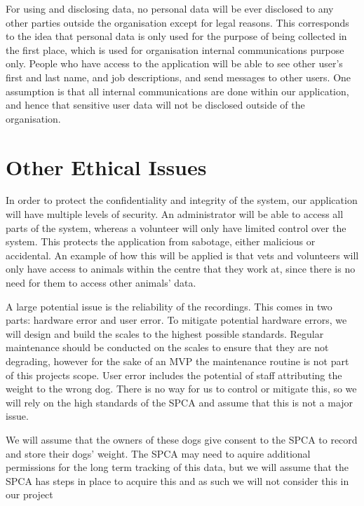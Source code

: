 For using and disclosing data, no personal data will be ever disclosed to any other parties outside the organisation except for legal reasons. This corresponds to the idea that personal data is only used for the purpose of being collected in the first place, which is used for organisation internal communications purpose only. People who have access to the application will be able to see other user's first and last name, and job descriptions, and send messages to other users. One assumption is that all internal communications are done within our application, and hence that sensitive user data will not be disclosed outside of the organisation.


\section{Other Ethical Issues}

In order to protect the confidentiality and integrity of the system, our application will have multiple levels of security. An administrator will be able to access all parts of the system, whereas a volunteer will only have limited control over the system. This protects the application from sabotage, either malicious or accidental. An example of how this will be applied is that vets and volunteers will only have access to animals within the centre that they work at, since there is no need for them to access other animals’ data. 

A large potential issue is the reliability of the recordings. This comes in two parts: hardware error and user error. To mitigate potential hardware errors, we will design and build the scales to the highest possible standards. Regular maintenance should be conducted on the scales to ensure that they are not degrading, however for the sake of an MVP the maintenance routine is not part of this projects scope. User error includes the potential of staff attributing the weight to the wrong dog. There is no way for us to control or mitigate this, so we will rely on the high standards of the SPCA and assume that this is not a major issue. 

We will assume that the owners of these dogs give consent to the SPCA to record and store their dogs’ weight. The SPCA may need to aquire additional permissions for the long term tracking of this data, but we will assume that the SPCA has steps in place to acquire this and as such we will not consider this in our project 


